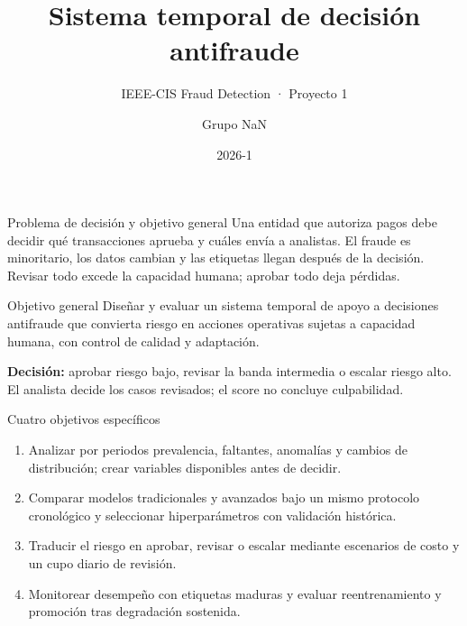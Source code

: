 \documentclass[aspectratio=169,11pt]{beamer}
\title{Sistema temporal de decisión antifraude}
\subtitle{IEEE-CIS Fraud Detection · Proyecto 1}
\author{Grupo NaN}
\institute{UTEC · Planificación y Toma de Decisiones en IA}
\date{2026-1}
\begin{document}
\begin{frame}
\titlepage
\end{frame}

\begin{frame}{Problema de decisión y objetivo general}\small
Una entidad que autoriza pagos debe decidir qué transacciones aprueba y cuáles envía a analistas. El fraude es minoritario, los datos cambian y las etiquetas llegan después de la decisión. Revisar todo excede la capacidad humana; aprobar todo deja pérdidas.
\vspace{4mm}
\begin{block}{Objetivo general}
Diseñar y evaluar un sistema temporal de apoyo a decisiones antifraude que convierta riesgo en acciones operativas sujetas a capacidad humana, con control de calidad y adaptación.
\end{block}
\vspace{3mm}
\textbf{Decisión:} aprobar riesgo bajo, revisar la banda intermedia o escalar riesgo alto. El analista decide los casos revisados; el score no concluye culpabilidad.
\end{frame}

\begin{frame}{Cuatro objetivos específicos}\small
\begin{enumerate}\setlength{\itemsep}{4mm}
\item Analizar por periodos prevalencia, faltantes, anomalías y cambios de distribución; crear variables disponibles antes de decidir.
\item Comparar modelos tradicionales y avanzados bajo un mismo protocolo cronológico y seleccionar hiperparámetros con validación histórica.
\item Traducir el riesgo en aprobar, revisar o escalar mediante escenarios de costo y un cupo diario de revisión.
\item Monitorear desempeño con etiquetas maduras y evaluar reentrenamiento y promoción tras degradación sostenida.
\end{enumerate}
\end{frame}
\end{document}
